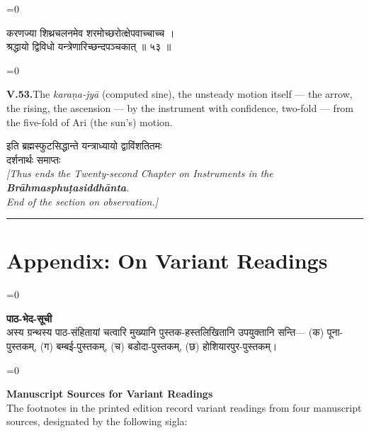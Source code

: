 \documentclass[11pt,a4paper]{article}
\newcommand{\longline}{\noindent\rule{\textwidth}{0.4pt}}
\newcommand{\dev}[1]{{\devanagarifont\color{sktcolor}#1}}
\newcommand{\iast}[1]{\textit{#1}}
\newenvironment{paracol}[1]{\begingroup}{\endgroup}
\newcommand{\switchcolumn}[1][]{%
  \ifnum#1=0\relax\else\par\nobreak\vspace{0.5em}\par\nobreak\fi%
}
\begin{document}
\begin{paracol}{2}
\switchcolumn[0]
\dev{%
करणज्या शिथ्रचलनमेव शरमोच्छरोत्क्षेपवाच्चाच्च ।\\
श्रद्धायो द्विविधो यन्त्रेणारिच्छन्दपञ्चकात् ॥ ५३ ॥
}

\switchcolumn[1]
\textbf{V.53.}\quad The \iast{karaṇa-jyā} (computed sine), the
unsteady motion itself — the arrow, the rising, the ascension —
by the instrument with confidence, two-fold — from the five-fold
of Ari (the sun's) motion.
\end{paracol}

\vspace{0.5cm}

\begin{center}
\dev{इति ब्रह्मस्फुटसिद्धान्ते यन्त्राध्यायो द्वाविंशतितमः}\\[0.3cm]
\dev{दर्शनार्थः समाप्तः}\\[0.5cm]
\textit{[Thus ends the Twenty-second Chapter on Instruments in the
\textbf{Brāhmasphuṭasiddhānta}.\\
End of the section on observation.]}
\end{center}

\vspace{1cm}
\longline
\newpage

\section*{Appendix: On Variant Readings}

\begin{paracol}{2}
\switchcolumn[0]
\dev{%
\textbf{पाठ-भेद-सूची}\\[0.2cm]
अस्य ग्रन्थस्य पाठ-संहितायां चत्वारि मुख्यानि
पुस्तक-हस्तलिखितानि उपयुक्तानि सन्ति—
(क) पूना-पुस्तकम्, (ग) बम्बई-पुस्तकम्, (च) बडोदा-पुस्तकम्,
(छ) होशियारपुर-पुस्तकम्।
}

\switchcolumn[1]
\textbf{Manuscript Sources for Variant Readings}\\[0.2cm]
The footnotes in the printed edition record variant readings from
four manuscript sources, designated by the following sigla:
\end{paracol}

\vspace{0.3cm}
\end{document}
